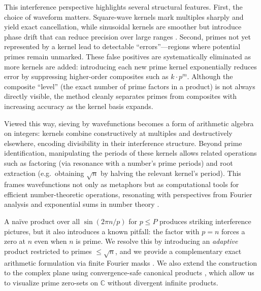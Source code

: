 \documentclass[12pt]{article}
\theoremstyle{definition}
\theoremstyle{remark}
\newcommand{\C}{\mathbb{C}}
\begin{document}
This interference perspective highlights several structural features. 
First, the choice of waveform matters. 
Square-wave kernels mark multiples sharply and yield exact cancellation, while sinusoidal kernels are smoother but introduce phase drift that can reduce precision over large ranges \citep{tenenbaum2015analytic,montgomery2007multiplicative}. 
Second, primes not yet represented by a kernel lead to detectable “errors”---regions where potential primes remain unmarked. 
These false positives are systematically eliminated as more kernels are added: introducing each new prime kernel exponentially reduces error by suppressing higher-order composites such as \(k\cdot p^m\). 
Although the composite “level” (the exact number of prime factors in a product) is not always directly visible, the method cleanly separates primes from composites with increasing accuracy as the kernel basis expands.

Viewed this way, sieving by wavefunctions becomes a form of arithmetic algebra on integers: kernels combine constructively at multiples and destructively elsewhere, encoding divisibility in their interference structure. 
Beyond prime identification, manipulating the periods of these kernels allows related operations such as factoring (via resonance with a number’s prime periods) and root extraction (e.g.\ obtaining \(\sqrt{n}\) by halving the relevant kernel’s period). 
This frames wavefunctions not only as metaphors but as computational tools for efficient number-theoretic operations, resonating with perspectives from Fourier analysis and exponential sums in number theory \citep{iwankowalski2004analytic}.

A naïve product over all \(\sin(2\pi n/p)\) for \(p \le P\) produces striking interference pictures, but it also introduces a known pitfall: the factor with \(p=n\) forces a zero at \(n\) even when \(n\) is prime. 
We resolve this by introducing an \emph{adaptive} product restricted to primes \(\le \sqrt{n}\), and we provide a complementary exact arithmetic formulation via finite Fourier masks \citep{terras2013fourier}. 
We also extend the construction to the complex plane using convergence-safe canonical products \citep{boas1954entire}, which allow us to visualize prime zero-sets on \(\C\) without divergent infinite products.
\end{document}
